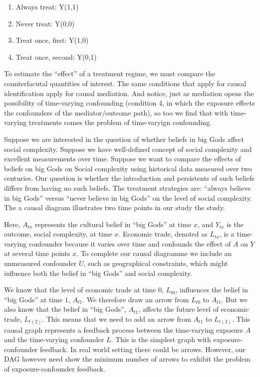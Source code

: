 \documentclass[
  singlecolumn]{report}
\providecommand{\tightlist}{%
  \setlength{\itemsep}{0pt}\setlength{\parskip}{0pt}}\usepackage{longtable,booktabs,array}
\begin{document}
\begin{enumerate}
\def\labelenumi{\arabic{enumi}.}
\tightlist
\item
  Always treat: Y(1,1)
\item
  Never treat: Y(0,0)
\item
  Treat once, first: Y(1,0)
\item
  Treat once, second: Y(0,1)
\end{enumerate}

To estimate the ``effect'' of a treatment regime, we must compare the
counterfacutal quantities of interest. The same conditions that apply
for causal identification apply for causal mediation. And notice, just
as mediation opens the possibility of time-varying confounding
(condition 4, in which the exposure effects the confounders of the
mediator/outcome path), so too we find that with time-varying treatments
comes the problem of time-varyign confounding.

Suppose we are interested in the question of whether beliefs in big Gods
affect social complexity. Suppose we have well-defined concept of social
complexity and excellent measurements over time. Suppose we want to
compare the effects of beliefs on big Gods on Social complexity using
historical data measured over two centuries. Our question is whether the
introduction and persistents of such beliefs differs from having no such
beliefs. The treatment strategies are: ``always believe in big Gods''
versus ``never believe in big Gods'' on the level of social complexity.
The a causal diagram illustrates two time points in our study the study.

Here, \(A_{tx}\) represents the cultural belief in ``big Gods'' at time
\(x\), and \(Y_{tx}\) is the outcome, social complexity, at time \(x\).
Economic trade, denoted as \(L_{tx}\), is a time-varying confounder
because it varies over time and confounds the effect of \(A\) on \(Y\)
at several time points \(x\). To complete our causal diagramme we
include an unmeasured confounder \(U\), such as geographical
constraints, which might influence both the belief in ``big Gods'' and
social complexity.

We know that the level of economic trade at time \(0\), \(L_{t0}\),
influences the belief in ``big Gods'' at time \(1\), \(A_{t1}\). We
therefore draw an arrow from \(L_{t0}\) to \(A_{t1}\). But we also know
that the belief in ``big Gods'', \(A_{t1}\), affects the future level of
economic trade, \(L_{t(2)}\). This means that we need to add an arrow
from \(A_{t1}\) to \(L_{t(2)}\). This causal graph represents a feedback
process between the time-varying exposure \(A\) and the time-varying
confounder \(L\). This is the simplest graph with exposure-confounder
feedback. In real world setting there could be arrows. However, our DAG
however need show the minimum number of arrows to exhibit the problem of
exposure-confounder feedback.
\end{document}
